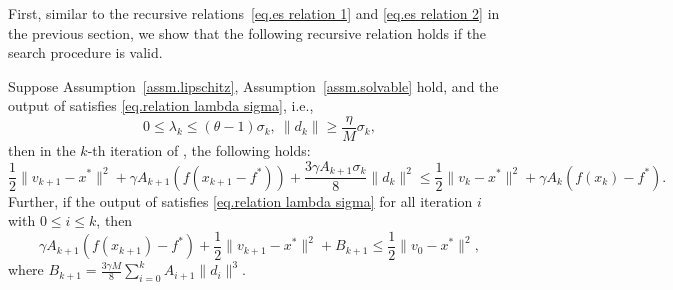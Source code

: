 \documentclass{mcom-l}
\numberwithin{equation}{section}
\begin{document}
First, similar to the recursive relations~\eqref{eq.es relation 1} and \eqref{eq.es relation 2} in the previous section, we show that the following recursive relation holds if the search procedure is valid.
\begin{lemma}\label{lem.ms estimate}
    Suppose Assumption~\ref{assm.lipschitz}, Assumption~\ref{assm.solvable} hold, and the output of  satisfies \eqref{eq.relation lambda sigma}, i.e.,
    \begin{equation*}
        0\leq\lambda_k\leq (\theta-1)\sigma_k, \ \|d_k\|\geq \frac{\eta}{M}\sigma_k,
    \end{equation*}
    then in the $k$-th iteration of , the following holds:
    \begin{equation}
        \label{eq.helper bounded x}
        \frac{1}{2}\|v_{k+1}-x^* \|^2 +\gamma A_{k+1}\left (f(x_{k+1}-f^*)\right)+ \frac{3\gamma A_{k+1}\sigma_k}{8}\|d_k\|^2 \leq \frac{1}{2}\|v_k-x^*\|^2 +\gamma A_k \left (f(x_k)-f^*\right).
    \end{equation}
    Further, if the output of  satisfies \eqref{eq.relation lambda sigma} for all iteration $i$ with $0\leq i\leq k$, then
    \begin{equation}
        \label{eq.ms estimate advanced}
        \gamma A_{k+1}\left (f(x_{k+1})-f^* \right) + \frac{1}{2}\|v_{k+1}-x^*\|^2 +B_{k+1} \leq \frac{1}{2}\|v_0-x^*\|^2,
    \end{equation}
    where $B_{k+1} = \frac{3\gamma M}{8}\sum_{i=0}^{k}A_{i+1}\|d_i\|^3.$
\end{lemma}
\end{document}
